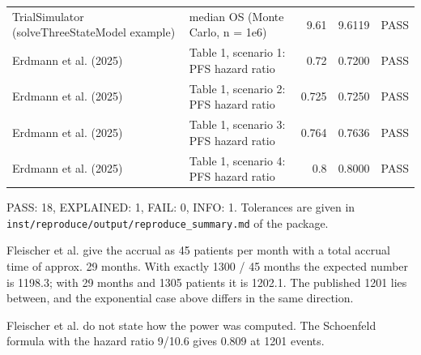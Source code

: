 \begin{table}[htbp]
\begin{threeparttable}
\begin{tabular}{p{2.2cm}p{4.8cm}rrl}
TrialSimulator (solveThreeStateModel example) & median OS (Monte Carlo, n = 1e6) &    9.61 & 9.6119 & PASS \\
Erdmann et al. (2025) & Table 1, scenario 1: PFS hazard ratio &    0.72 & 0.7200 & PASS \\
Erdmann et al. (2025) & Table 1, scenario 2: PFS hazard ratio &   0.725 & 0.7250 & PASS \\
Erdmann et al. (2025) & Table 1, scenario 3: PFS hazard ratio &   0.764 & 0.7636 & PASS \\
Erdmann et al. (2025) & Table 1, scenario 4: PFS hazard ratio &     0.8 & 0.8000 & PASS \\
\bottomrule
\end{tabular}
\begin{tablenotes}
\footnotesize
\item PASS: 18, EXPLAINED: 1, FAIL: 0, INFO: 1. Tolerances are given in \texttt{inst/reproduce/output/reproduce\_summary.md} of the package.
\item [a] Fleischer et al. give the accrual as 45 patients per month with a total accrual time of approx. 29 months. With exactly 1300 / 45 months the expected number is 1198.3; with 29 months and 1305 patients it is 1202.1. The published 1201 lies between, and the exponential case above differs in the same direction.
\item [b] Fleischer et al. do not state how the power was computed. The Schoenfeld formula with the hazard ratio 9/10.6 gives 0.809 at 1201 events.
\end{tablenotes}
\end{threeparttable}
\end{table}
